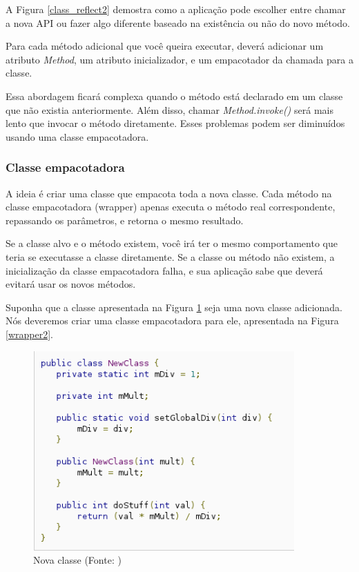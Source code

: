 A Figura \ref{class_reflect2} demostra como a aplicação pode escolher entre chamar 
a nova API ou fazer algo diferente baseado na existência ou não do novo método.

Para cada método adicional que você queira executar, deverá adicionar um atributo 
{\it Method}, um atributo inicializador, e um empacotador da chamada para a classe.

Essa abordagem ficará complexa quando o método está declarado em um classe que não 
existia anteriormente. Além disso, chamar {\it Method.invoke()} será mais lento 
que invocar o método diretamente. Esses problemas podem ser diminuídos usando uma
classe empacotadora.

\subsubsection{Classe empacotadora}

A ideia é criar uma classe que empacota toda a nova classe. Cada método na classe 
empacotadora (wrapper) apenas executa o método real correspondente, repassando os 
parâmetros, e retorna o mesmo resultado.

Se a classe alvo e o método existem, você irá ter o mesmo comportamento que teria se 
executasse a classe diretamente. Se a classe ou método não existem, a inicialização
da classe empacotadora falha, e sua aplicação sabe que deverá evitará usar os novos 
métodos.

Suponha que a classe apresentada na Figura \ref{wrapper1} seja uma nova classe adicionada.
Nós deveremos criar uma classe empacotadora para ele, apresentada na Figura \ref{wrapper2}.

\begin{figure}[h]
    \centering
    \includegraphics[width=10cm]{img/wrapper1}
    \caption{Nova classe (Fonte: \cite{back_compat})}
    \label{wrapper1}
\end{figure}


